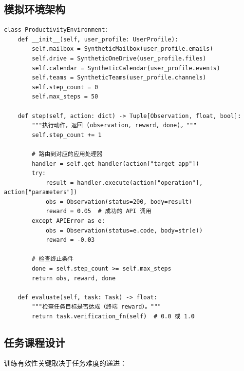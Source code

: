 \subsection{模拟环境架构}
\label{simulation-environment-architecture}

\begin{examplebox}
\begin{lstlisting}[style=pythonstyle]
class ProductivityEnvironment:
    def __init__(self, user_profile: UserProfile):
        self.mailbox = SyntheticMailbox(user_profile.emails)
        self.drive = SyntheticOneDrive(user_profile.files)
        self.calendar = SyntheticCalendar(user_profile.events)
        self.teams = SyntheticTeams(user_profile.channels)
        self.step_count = 0
        self.max_steps = 50

    def step(self, action: dict) -> Tuple[Observation, float, bool]:
        """执行动作，返回 (observation, reward, done)。"""
        self.step_count += 1

        # 路由到对应的应用处理器
        handler = self.get_handler(action["target_app"])
        try:
            result = handler.execute(action["operation"], action["parameters"])
            obs = Observation(status=200, body=result)
            reward = 0.05  # 成功的 API 调用
        except APIError as e:
            obs = Observation(status=e.code, body=str(e))
            reward = -0.03

        # 检查终止条件
        done = self.step_count >= self.max_steps
        return obs, reward, done

    def evaluate(self, task: Task) -> float:
        """检查任务目标是否达成（终端 reward）。"""
        return task.verification_fn(self)  # 0.0 或 1.0
\end{lstlisting}
\end{examplebox}

\subsection{任务课程设计}
\label{task-curriculum-design}

训练有效性关键取决于任务难度的递进：

